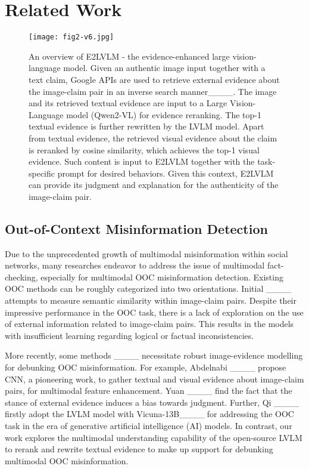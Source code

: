 \section{Related Work}
\label{sec:Related Work}

\begin{figure*}[t]
  \texttt{[image: fig2-v6.jpg]}
  \caption{An overview of E2LVLM - the evidence-enhanced large vision-language model. Given an authentic image input together with a text claim, Google APIs are used to retrieve external evidence about the image-claim pair in an inverse search manner____. The image and its retrieved textual evidence are input to a Large Vision-Language model (Qwen2-VL) for evidence reranking. The top-1 textual evidence is further rewritten by the LVLM model. Apart from textual evidence, the retrieved visual evidence about the claim is reranked by cosine similarity, which achieves the top-1 visual evidence. Such content is input to E2LVLM together with the task-specific prompt for desired behaviors. Given this context, E2LVLM can provide its judgment and explanation for the authenticity of the image-claim pair.}
  \label{fig:2}
\end{figure*}

\subsection{Out-of-Context Misinformation Detection}
Due to the unprecedented growth of multimodal misinformation within social networks, many researches endeavor to address the issue of multimodal fact-checking, especially for multimodal OOC misinformation detection. Existing OOC methods can be roughly categorized into two orientations. Initial ____ attempts to measure semantic similarity within image-claim pairs. Despite their impressive performance in the OOC task, there is a lack of exploration on the use of external information related to image-claim pairs. This results in the models with insufficient learning regarding logical or factual inconsistencies.

More recently, some methods ____ necessitate robust image-evidence modelling for debunking OOC misinformation. For example, Abdelnabi \etal____ propose CNN, a pioneering work, to gather textual and visual evidence about image-claim pairs, for multimodal feature enhancement. Yuan \etal____ find the fact that the stance of external evidence induces a bias towards judgment. Further, Qi \etal____ firstly adopt the LVLM model with Vicuna-13B____ for addressing the OOC task in the era of generative artificial intelligence (AI) models. In contrast, our work explores the multimodal understanding capability of the open-source LVLM to rerank and rewrite textual evidence to make up support for debunking multimodal OOC misinformation.

